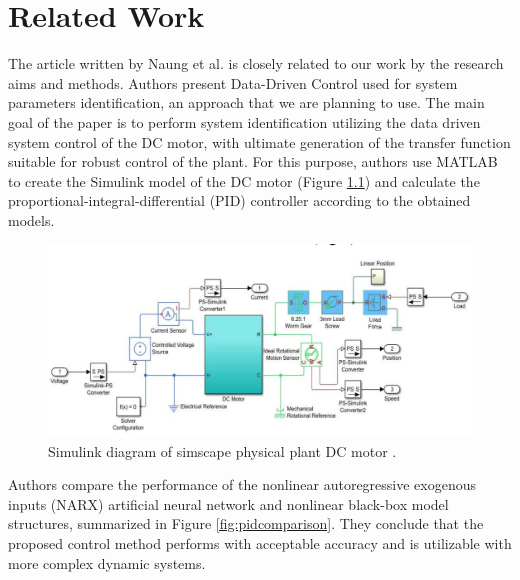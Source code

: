 \documentclass[]{final_report}
\begin{document}
\chapter{\label{chapter2} Related Work}


The article written by Naung et al. \cite{naung2018a} is closely related to our work by the research aims and methods. Authors present Data-Driven Control used for system parameters identification, an approach that we are planning to use. The main goal of the paper is to perform system identification utilizing the data driven system control of the DC motor, with ultimate generation of the transfer function suitable for robust control of the plant. For this purpose, authors use MATLAB to create the Simulink model of the DC motor (Figure \ref{fig:dcsimulink}) and calculate the proportional-integral-differential (PID) controller according to the obtained models.

\begin{figure} [h!]
\centerline{\includegraphics[width=.75\textwidth]{Screenshots for related work/1.png}}
\caption{Simulink diagram of simscape physical plant DC motor \cite{naung2018a}.}
\label{fig:dcsimulink}
\end{figure}

Authors compare the performance of the nonlinear autoregressive exogenous inputs (NARX) artificial neural network and nonlinear black-box model structures, summarized in Figure \ref{fig:pidcomparison}. They conclude that the proposed control method performs with acceptable accuracy and is utilizable with more complex dynamic systems. 
\end{document}
